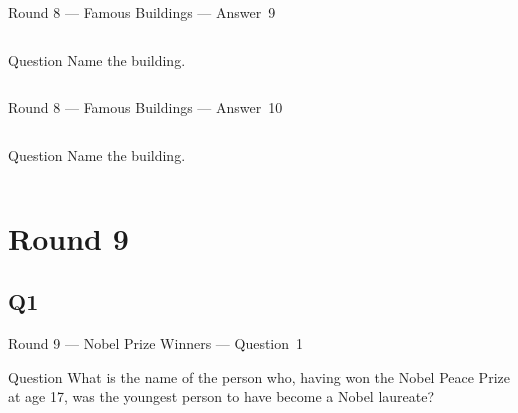 \documentclass[11pt]{beamer}
\begin{document}
\begin{frame}[t]{Round 8 --- Famous Buildings --- \mbox{Answer 9}}
\vspace{-0.5em}
\begin{columns}[T,totalwidth=\linewidth]
\begin{column}{0.32\linewidth}
\begin{block}{Question}
Name the building.
\end{block}
\end{column}
\begin{column}{0.65\linewidth}
\begin{center}
\texttt{[image: \{Images/tribune]}.jpg}
\end{center}
\end{column}
\end{columns}
\end{frame}
\begin{frame}[t]{Round 8 --- Famous Buildings --- \mbox{Answer 10}}
\vspace{-0.5em}
\begin{columns}[T,totalwidth=\linewidth]
\begin{column}{0.32\linewidth}
\begin{block}{Question}
Name the building.
\end{block}
\end{column}
\begin{column}{0.65\linewidth}
\begin{center}
\texttt{[image: \{Images/seagram]}.jpg}
\end{center}
\end{column}
\end{columns}
\end{frame}
\def\thisSectionName{Nobel Prize Winners}
\section{Round 9}
\subsection*{Q1}
\begin{frame}[t]{Round 9 --- Nobel Prize Winners --- \mbox{Question 1}}
\vspace{-0.5em}
\begin{block}{Question}
What is the name of the person who, having won the Nobel Peace Prize at age 17, was the youngest person to have become a Nobel laureate?
\end{block}
\end{frame}
\end{document}
